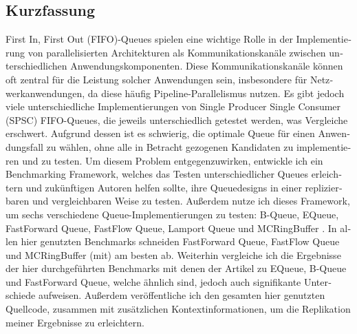\null\vfil
\begin{otherlanguage}{ngerman}

\chapter{Kurzfassung}

\noindent First In, First Out (FIFO)-Queues spielen eine wichtige Rolle in der Implementierung von
parallelisierten Architekturen als Kommunikationskanäle zwischen unterschiedlichen
Anwendungskomponenten\cite{WangCheng2009}.
Diese Kommunikationskanäle können oft zentral für die Leistung solcher Anwendungen sein, insbesondere für
Netzwerkanwendungen, da diese häufig Pipeline-Parallelismus nutzen\cite{Upadhyaya2007,WangCheng2009}.
Es gibt jedoch viele unterschiedliche Implementierungen von Single Producer Single Consumer (SPSC)
FIFO-Queues, die jeweils unterschiedlich getestet werden, was Vergleiche erschwert.
Aufgrund dessen ist es schwierig, die optimale Queue für einen Anwendungsfall zu wählen, ohne alle in
Betracht gezogenen Kandidaten zu implementieren und zu testen.
Um diesem Problem entgegenzuwirken, entwickle ich ein Benchmarking Framework, welches das Testen
unterschiedlicher Queues erleichtern und zukünftigen Autoren helfen sollte, ihre Queuedesigns in einer
replizierbaren und vergleichbaren Weise zu testen.
Außerdem nutze ich dieses Framework, um sechs verschiedene Queue-Implementierungen zu testen: B-Queue,
EQueue, FastForward Queue, FastFlow Queue, Lamport Queue und MCRingBuffer
\cite{B-Queue,EQueue,FastForward,FastFlowGithub,Lamport,MCRingBuffer}.
In allen hier genutzten Benchmarks schneiden FastForward Queue, FastFlow Queue und MCRingBuffer (mit) am besten ab.
Weiterhin vergleiche ich die Ergebnisse der hier durchgeführten Benchmarks mit denen der Artikel zu
EQueue, B-Queue und FastForward Queue, welche ähnlich sind, jedoch auch signifikante Unterschiede aufweisen.
Außerdem veröffentliche ich den gesamten hier genutzten Quellcode, zusammen mit zusätzlichen
Kontextinformationen, um die Replikation meiner Ergebnisse zu erleichtern.

\end{otherlanguage}
\vfil\null
